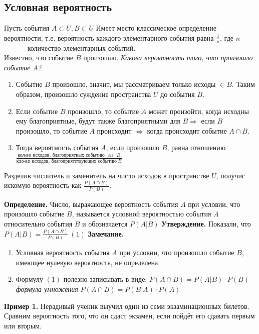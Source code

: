 \documentclass{article}
\begin{document}
    \subsection{Условная вероятность}

    Пусть события \(A \subset U, B \subset U \)
    Имеет место классическое определение вероятности, т.е. вероятность каждого элементарного события равна \(\frac{1}{n}\),
    где $n$ ——— количество элементарных событий.\\
    Известно, что событие $B$ произошло.
    \textit{Какова вероятность того, что произошло событие $A$?}
    \begin{enumerate}
        \item Событие $B$ произошло, значит, мы рассматриваем только исходы $\in B$. Таким образом, произошло суждение пространства $U$ до события $B$. 
        \item Если событие $B$ произошло, то событие $A$ может произойти, когда исходны ему благоприятные, будут также благоприятными для $B \Rightarrow $ если $B$ произошло, то событие $A$ происходит $\Leftrightarrow $ когда происходит событие $A\cap B$.
        \item Тогда вероятность события $A$, если произошло $B$, равна отношению \\
        \(\frac{\textrm{кол-во исходов, благоприятных событию } \ A\cap B}{\textrm{кло-во исходов, благоприятствующих событию} \ B}\)
    \end{enumerate}

    Разделив числитель и заменитель на число исходов в пространстве $U$, получис искомую вероятность как \(\frac{P(A\cap B)}{P(B)}\).

    \textbf{Определение.} Число, выражающее вероятность события $A$ при условии, что произошло событие $B$, называется условной вероятностью события $A$ относительно события $B$ и обозначается \(P(A|B)\)
    \textbf{Утверждение.} Показали, что \(P(A|B) = \frac{P(A \cap B)}{P(B)} \ (1)\)
    \textbf{Замечание.}
    \begin{enumerate}
        \item Условная вероятность события $A$ при условии, что произошло событие $B$, имеющее нулевую вероятность, не определена.
        \item Формулу $(1)$ полезно записывать в виде: \(P(A \cap B) = P(A|B) \cdot P(B)\) \textit{формула умножения} \(P(A \cap B) = P(B|A) \cdot P(A)\)
    \end{enumerate}
    \textbf{Пример 1.} Нерадивый ученик выучил один из семи экзаминационных билетов. Сравним вероятность того, что он сдаст экзамен, если пойдёт его сдавать первым или вторым.
\end{document}
